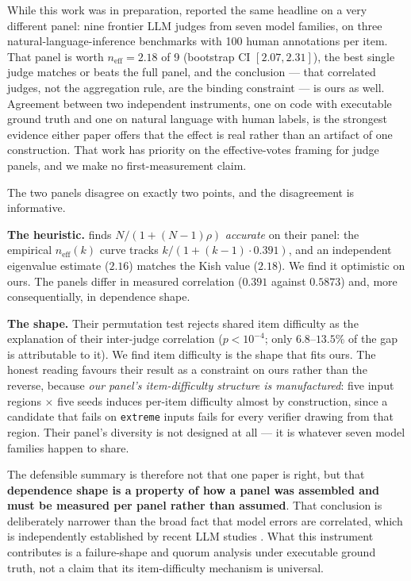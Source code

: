 \documentclass[11pt,a4paper]{article}
\newcommand{\neff}{n_{\mathrm{eff}}}
\newcommand{\code}[1]{\texttt{#1}}
\begin{document}
While this work was in preparation, \citet{kohli2026} reported the same headline
on a very different panel: nine frontier LLM judges from seven model families, on
three natural-language-inference benchmarks with 100 human annotations per item.
That panel is worth $\neff = 2.18$ of 9 (bootstrap CI $[2.07, 2.31]$), the best
single judge matches or beats the full panel, and the conclusion --- that
correlated judges, not the aggregation rule, are the binding constraint --- is
ours as well. Agreement between two independent instruments, one on code with
executable ground truth and one on natural language with human labels, is the
strongest evidence either paper offers that the effect is real rather than an
artifact of one construction. That work has priority on the effective-votes
framing for judge panels, and we make no first-measurement claim.

The two panels disagree on exactly two points, and the disagreement is
informative.

\textbf{The heuristic.} \citet{kohli2026} finds $N/(1+(N-1)\rho)$ \emph{accurate}
on their panel: the empirical $\neff(k)$ curve tracks $k/(1+(k-1)\cdot 0.391)$,
and an independent eigenvalue estimate ($2.16$) matches the Kish value ($2.18$).
We find it optimistic on ours. The panels differ in measured correlation
($0.391$ against $0.5873$) and, more consequentially, in dependence shape.

\textbf{The shape.} Their permutation test rejects shared item difficulty as the
explanation of their inter-judge correlation ($p < 10^{-4}$; only $6.8$--$13.5\%$
of the gap is attributable to it). We find item difficulty is the shape that fits
ours. The honest reading favours their result as a constraint on ours rather than
the reverse, because \emph{our panel's item-difficulty structure is
manufactured}: five input regions $\times$ five seeds induces per-item difficulty
almost by construction, since a candidate that fails on \code{extreme} inputs
fails for every verifier drawing from that region. Their panel's diversity is not
designed at all --- it is whatever seven model families happen to share.

The defensible summary is therefore not that one paper is right, but that
\textbf{dependence shape is a property of how a panel was assembled and must be
measured per panel rather than assumed}. That conclusion is deliberately narrower
than the broad fact that model errors are correlated, which is independently
established by recent LLM studies \citep{kim2025correlated,goel2025great,
denisov2026truthfulness,zhao2026care}. What this instrument contributes is a
failure-shape and quorum analysis under executable ground truth, not a claim that
its item-difficulty mechanism is universal.
\end{document}
